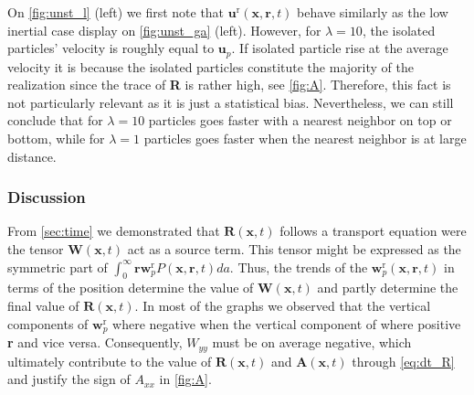On \ref{fig:unst_l} (left) we first note that $\textbf{u}^\text{r}(\textbf{x},\textbf{r},t)$ behave similarly as the low inertial case display on \ref{fig:unst_ga} (left).
However, for $\lambda = 10$, the isolated particles' velocity is roughly equal to $\textbf{u}_p$. 
If isolated particle rise at the average velocity it is because the isolated particles constitute the majority of the realization since the trace of \textbf{R} is rather high, see \ref{fig:A}.
Therefore, this fact is not particularly relevant as it is just a statistical bias. 
Nevertheless, we can still conclude that for $\lambda = 10$ particles goes faster with a nearest neighbor on top or bottom, while for  $\lambda = 1$ particles goes faster when the nearest neighbor is at large distance. 


\subsubsection*{Discussion}

From \ref{sec:time} we demonstrated that $\textbf{R}(\textbf{x},t)$ follows a transport equation were the tensor $\textbf{W}(\textbf{x},t)$ act as a source term. 
This tensor might be expressed as the symmetric part of $\int_0^\infty \textbf{r} \textbf{w}_p^\text{r} P(\textbf{x},\textbf{r},t) da$. 
Thus, the trends of the $\textbf{w}_p^\text{r}(\textbf{x},\textbf{r},t) $ in terms of the position determine the value of $\textbf{W}(\textbf{x},t)$ and partly determine the final value of $\textbf{R}(\textbf{x},t)$. 
In most of the graphs we observed that the vertical components of $\textbf{w}_p^\text{r}$ where negative when the vertical component of where positive \textbf{r} and vice versa. 
Consequently, $W_{yy}$ must be on average negative, which ultimately contribute to the value of $\textbf{R}(\textbf{x},t)$ and $\textbf{A}(\textbf{x},t)$ through \ref{eq:dt_R} and justify the sign of $A_{xx}$ in \ref{fig:A}. 

